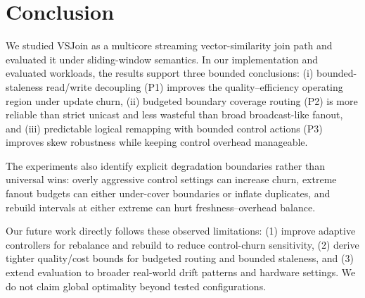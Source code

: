 \section{Conclusion}
\label{sec:conclusion}

We studied VSJoin as a multicore streaming vector-similarity join path and evaluated it under sliding-window semantics. In our implementation and evaluated workloads, the results support three bounded conclusions: (i) bounded-staleness read/write decoupling (P1) improves the quality--efficiency operating region under update churn, (ii) budgeted boundary coverage routing (P2) is more reliable than strict unicast and less wasteful than broad broadcast-like fanout, and (iii) predictable logical remapping with bounded control actions (P3) improves skew robustness while keeping control overhead manageable.

The experiments also identify explicit degradation boundaries rather than universal wins: overly aggressive control settings can increase churn, extreme fanout budgets can either under-cover boundaries or inflate duplicates, and rebuild intervals at either extreme can hurt freshness--overhead balance.

Our future work directly follows these observed limitations: (1) improve adaptive controllers for rebalance and rebuild to reduce control-churn sensitivity, (2) derive tighter quality/cost bounds for budgeted routing and bounded staleness, and (3) extend evaluation to broader real-world drift patterns and hardware settings. We do not claim global optimality beyond tested configurations.
